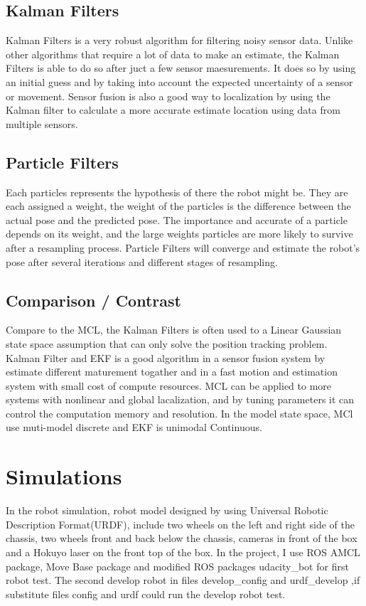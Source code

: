 \documentclass[10pt,journal,compsoc]{IEEEtran}
\begin{document}
\subsection{Kalman Filters}
Kalman Filters is a very robust algorithm for filtering noisy sensor data. Unlike other algorithms that require a lot of data to make an estimate, the Kalman Filters is able to do so after juct a few sensor maesurements. It does so by using an initial guess and by taking into account the expected uncertainty of a sensor or movement. Sensor fusion is also a good way to localization by  using the Kalman filter to calculate a more accurate estimate location using data from multiple sensors. 

\subsection{Particle Filters}
Each particles represents the hypothesis of there the robot might be. They are each assigned a weight, the weight of the particles is the difference between the actual pose and the predicted pose. The importance and accurate of a particle depends on its weight, and the large weights particles are more likely to survive after a resampling process. Particle Filters will converge and estimate the robot's pose after several iterations and different stages of resampling.

\subsection{Comparison / Contrast}
Compare to the MCL, the Kalman Filters is often used to a Linear Gaussian state space assumption that can only solve the position tracking problem. Kalman Filter and EKF is a good algorithm in a sensor fusion system by estimate different maturement togather and in a fast motion and estimation system with small cost of compute resources. MCL can be applied to more systems with nonlinear and global lacalization, and by tuning parameters it can control the computation memory and resolution. In the model state space, MCl use muti-model discrete  and EKF is unimodal Continuous.


\section{Simulations}
In the robot simulation,  robot model designed by using Universal Robotic Description Format(URDF), include two wheels on the left and right side of the chassis, two wheels front and back below the chassis, cameras in front of the box and a Hokuyo laser on the front top of the box. In the project, I use ROS AMCL package, Move Base package and modified ROS packages udacity\_bot for first robot test. The second develop robot in files develop\_config and urdf\_develop ,if substitute files config and urdf could run the develop robot test.
\end{document}
